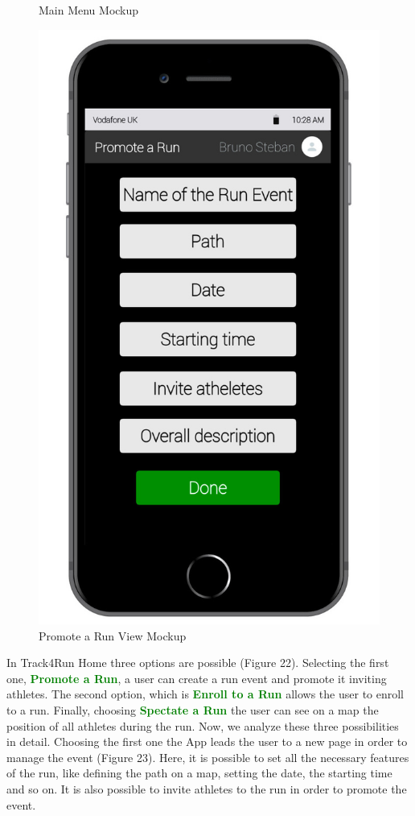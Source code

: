 \begin{enumerate}
\begin{figure}[H]
\begin{center}
\begin{minipage}[c]{.40\textwidth}
	\caption{Main Menu Mockup}
        \end{minipage}%
        \hspace{10mm}%
        \begin{minipage}[c]{.40\textwidth}
        \centering
          \includegraphics[height=14 cm]{Images/Mockups/Track4RunMockup6.jpg}
	\caption{Promote a Run View Mockup}
        \end{minipage}
      \end{center}
\end{figure}
In Track4Run Home three options are possible (Figure 22). Selecting the first one, {\textcolor{Green}{\textbf{Promote a Run}}}, a user can create a run event and promote it inviting athletes. The second option, which is {\textcolor{Green}{\textbf{Enroll to a Run}}} allows the user to enroll to a run. Finally, choosing {\textcolor{Green}{\textbf{Spectate a Run}}} the user can see on a map the position of all athletes during the run. Now, we analyze these three possibilities in detail. Choosing the first one the App leads the user to a new page in order to manage the event (Figure 23). Here, it is possible to set all the necessary features of the run, like defining the path on a map, setting the date, the starting time and so on. It is also possible to invite athletes to the run in order to promote the event.

\end{enumerate}
